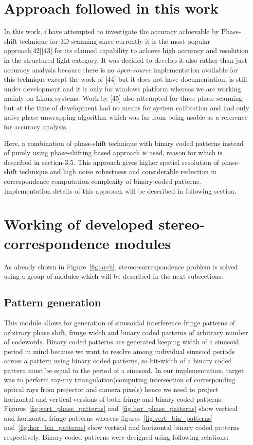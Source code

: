 \section{Approach followed in this work}
In this work, i have attempted to investigate the accuracy achievable by Phase-shift technique for 3D scanning since currently it is the most popular approach[42][43] for its claimed capability to achieve high accuracy and resolution in the structured-light category. It was decided to develop it also rather than just accuracy analysis because there is no \textit{open-source} implementation available for this technique except the work of [44] but it does not have documentation, is still under development and it is only for windows platform whereas we are working mainly on Linux systems. Work by [45] also attempted for three phase scanning but at the time of development had no means for system calibration and had only naive phase unwrapping algorithm which was far from being usable as a reference for accuracy analysis. \newline


Here, a combination of phase-shift technique with binary coded patterns instead of purely using phase-shifting based approach is used, reason for which is described in section-3.5. This approach gives higher spatial resolution of phase-shift technique and high noise robustness and considerable reduction in correspondence computation complexity of binary-coded patterns. Implementation details of this approach will be described in following section.   

\section{Working of developed stereo-correspondence modules}
As already shown in Figure~\ref{fig:arch}, stereo-correspondence problem is solved using a group of modules which will be described in the next subsections.

\subsection{Pattern generation}
This module allows for generation of sinusoidal interference fringe patterns of arbitrary phase shift, fringe width and binary coded patterns of arbitrary number of codewords. Binary coded patterns are generated keeping width of a sinusoid period in mind because we want to resolve among individual sinusoid periods across a pattern using binary coded patterns, so bit-width of a binary coded pattern must be equal to the period of a sinusoid. In our implementation, target was to perform ray-ray triangulation(computing intersection of corresponding optical rays from projector and camera pixels) hence we need to project horizontal and vertical versions of both fringe and binary coded patterns. Figures~\ref{fig:vert_phase_patterns} and~\ref{fig:hor_phase_patterns} show vertical and horizontal fringe patterns whereas figures~\ref{fig:vert_bin_patterns} and~\ref{fig:hor_bin_patterns} show vertical and horizontal binary coded patterns respectively. Binary coded patterns were designed using following relations:\newline

